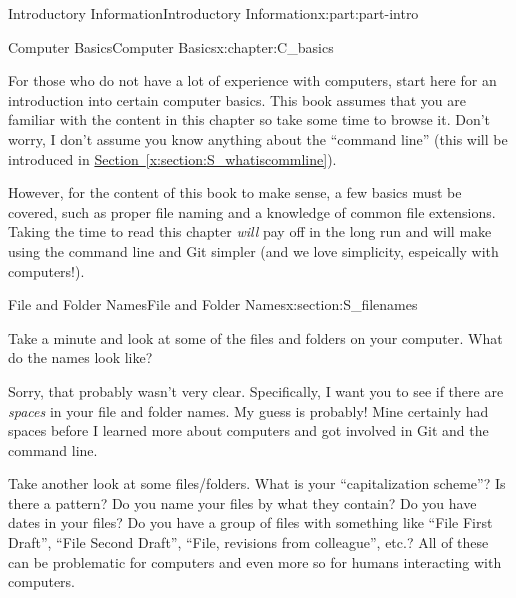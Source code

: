 \documentclass[oneside,10pt,]{book}
\newcommand{\xreffont}{\relax}
\begin{document}
\setcounter{tocdepth}{0}
\renewcommand*\contentsname{Contents}
\tableofcontents
\mainmatter
%
%
\typeout{************************************************}
\typeout{************************************************}
%
\begin{partptx}{Introductory Information}{}{Introductory Information}{}{}{x:part:part-intro}
%
\typeout{************************************************}
\typeout{************************************************}
%
\begin{chapterptx}{Computer Basics}{}{Computer Basics}{}{}{x:chapter:C_basics}
\begin{introduction}{}%
For those who do not have a lot of experience with computers, start here for an introduction into certain computer basics. This book assumes that you are familiar with the content in this chapter so take some time to browse it. Don't worry, I don't assume you know anything about the ``command line'' (this will be introduced in \hyperref[x:section:S_whatiscommline]{Section~{\xreffont\ref{x:section:S_whatiscommline}}}).%
\par
However, for the content of this book to make sense, a few basics must be covered, such as proper file naming and a knowledge of common file extensions. Taking the time to read this chapter \emph{will} pay off in the long run and will make using the command line and Git simpler (and we love simplicity, espeically with computers!).%
\end{introduction}%
%
%
\typeout{************************************************}
\typeout{************************************************}
%
\begin{sectionptx}{File and Folder Names}{}{File and Folder Names}{}{}{x:section:S_filenames}
%
%
\begin{introduction}{}%
Take a minute and look at some of the files and folders on your computer. What do the names look like?%
\par
Sorry, that probably wasn't very clear. Specifically, I want you to see if there are \emph{spaces} in your file and folder names. My guess is probably! Mine certainly had spaces before I learned more about computers and got involved in Git and the command line.%
\par
Take another look at some files\slash{}folders. What is your ``capitalization scheme''? Is there a pattern? Do you name your files by what they contain? Do you have dates in your files? Do you have a group of files with something like ``File First Draft'', ``File Second Draft'', ``File, revisions from colleague'', etc.? All of these can be problematic for computers and even more so for humans interacting with computers.%

\end{introduction}
\end{sectionptx}
\end{chapterptx}
\end{partptx}
\end{document}
